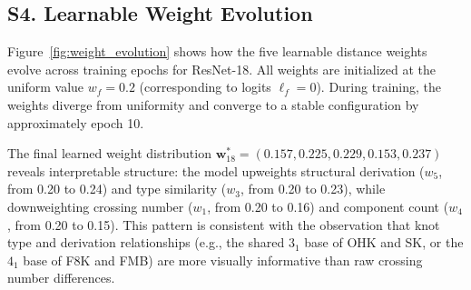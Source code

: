 \documentclass[preprint,review,12pt]{elsarticle}
\begin{document}
\begin{table}[htbp]
\centering
\caption{Complete $\delta_5$ (structural derivation) matrix for all 45 knot pairs. Four pairs with known shared mathematical structure receive reduced penalties; all other pairs default to 0.5. Together with Table~\ref{tab:knot_taxonomy}, this table enables full reproduction of the $10 \times 10$ topological distance matrix.}
\label{tab:delta5}
\small
{}
\end{table}

\subsection*{S4. Learnable Weight Evolution}\label{sec:supp_weights}

Figure~\ref{fig:weight_evolution} shows how the five learnable distance weights evolve across training epochs for ResNet-18. All weights are initialized at the uniform value $w_f = 0.2$ (corresponding to logits $\ell_f = 0$). During training, the weights diverge from uniformity and converge to a stable configuration by approximately epoch 10.

The final learned weight distribution $\mathbf{w}^*_{18} = (0.157, 0.225, 0.229, 0.153, 0.237)$ reveals interpretable structure: the model upweights structural derivation ($w_5$, from 0.20 to 0.24) and type similarity ($w_3$, from 0.20 to 0.23), while downweighting crossing number ($w_1$, from 0.20 to 0.16) and component count ($w_4$, from 0.20 to 0.15). This pattern is consistent with the observation that knot type and derivation relationships (e.g., the shared $3_1$ base of OHK and SK, or the $4_1$ base of F8K and FMB) are more visually informative than raw crossing number differences.
\end{document}
